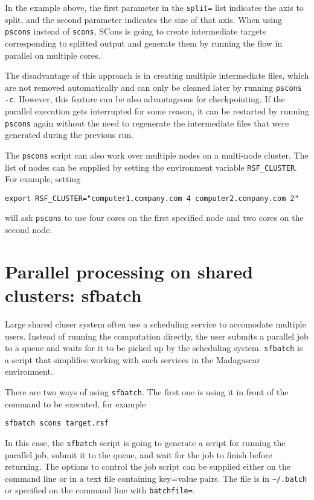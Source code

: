 In the example above, the first parameter in the \texttt{split=} list indicates the axis to
split, and the second parameter indicates the size of that axis. When
using \texttt{pscons} instead of \texttt{scons}, SCons is going to
create intermediate targets corresponding to splitted output and
generate them by running the flow in parallel on multiple cores.

The disadvantage of this approach is in creating multiple intermediate
files, which are not removed automatically and can only be cleaned
later by running \texttt{pscons -c}. However, this feature can be also
advantageous for checkpointing. If the parallel execution gets
interrupted for some reason, it can be restarted by running
\texttt{pscons} again without the need to regenerate the intermediate
files that were generated during the previous run.

The \texttt{pscons} script can also work over multiple nodes on a
multi-node cluster. The list of nodes can be supplied by setting the
environment variable \texttt{RSF\_CLUSTER}. For example, setting
\begin{verbatim}
export RSF_CLUSTER="computer1.company.com 4 computer2.company.com 2"
\end{verbatim}
will ask \texttt{pscons} to use four cores on the first specified node and two cores on the second node.

\section{Parallel processing on shared clusters: sfbatch}

Large shared cluser system often use a scheduling service to
accomodate multiple users. Instead of running the computation
directly, the user submits a parallel job to a queue and waits for it
to be picked up by the scheduling system. \texttt{sfbatch} is a script
that simplifies working with such services in the Madagascar
environment.

There are two ways of using \texttt{sfbatch}. The first one is using
it in front of the command to be executed, for example
\begin{verbatim}
sfbatch scons target.rsf
\end{verbatim}
In this case, the \texttt{sfbatch} script is going to generate a
script for running the parallel job, submit it to the queue, and wait
for the job to finish before returning. The options to control the job
script can be supplied either on the command line or in a text file
containing key=value pairs. The file is in \verb#~/.batch# or 
specified on the command line with \texttt{batchfile=}.

